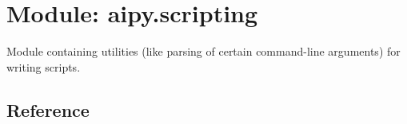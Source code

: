 \section{Module: aipy.scripting}
Module containing utilities (like parsing of certain command-line arguments) 
for writing scripts.

\subsection{Reference}

